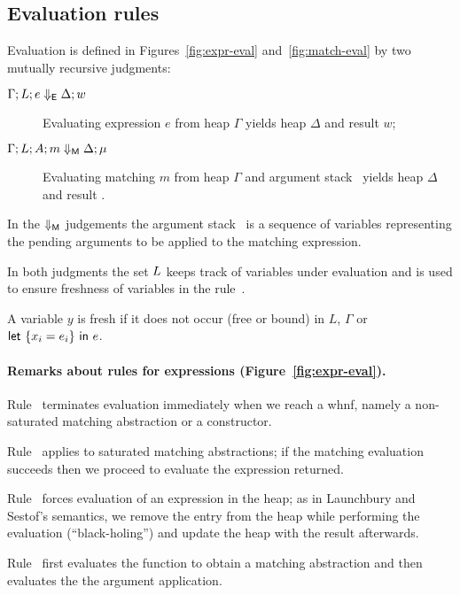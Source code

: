 \subsection{Evaluation rules}

Evaluation is defined in Figures~\ref{fig:expr-eval}
and~\ref{fig:match-eval} by two mutually recursive judgments:
\begin{description}
  \item[$\Gamma;L;e \Downarrow_{\textsf{E}} \Delta;w$]  Evaluating 
   expression $e$ from heap $\Gamma$ yields heap $\Delta$ and result $w$;
  \item[$\Gamma;L;A; m \Downarrow_{\textsf{M}} \Delta;\mu$] 
    Evaluating matching $m$ from heap $\Gamma$ and argument stack \argstack\
    yields heap $\Delta$ and result \matchresult.
  \end{description}

  In the $\Downarrow_{\textsf{M}}$ judgements the argument stack \argstack\ is
  a sequence of variables representing the pending arguments
  to be applied to the matching expression.

  In both judgments the set $L$ keeps track of variables under
  evaluation and is used to ensure freshness of variables in the
  \bigrule{Let} rule~\cite{sestof_1997}.
  \begin{definition}
    A variable $y$ is fresh if it does not occur (free or bound) in
    $L$, $\Gamma$ or $\textsf{let}~\{x_i=e_i\}~\textsf{in}~e$.
  \end{definition}
  

\paragraph{Remarks about rules for  expressions (Figure~\ref{fig:expr-eval}).}
  
  Rule~ terminates evaluation immediately when we reach a whnf,
  namely a non-saturated matching abstraction or a constructor.
  
  Rule~ applies to saturated matching abstractions;
  if the matching evaluation succeeds then
  we proceed to evaluate the expression returned.
    
  Rule~ forces evaluation of an expression in the heap; as in
  Launchbury and Sestof's semantics, we remove the entry
  from the heap  while performing the evaluation (``black-holing'')
  and update the heap with the result afterwards.
    
  Rule~ first evaluates the function to
  obtain a matching abstraction and then evaluates
  the the argument application.
    
